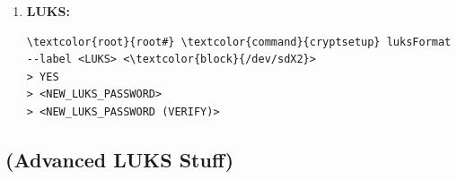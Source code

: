 \documentclass[10pt, a4paper, onecolumn, oneside, titlepage, openany]{book}
\begin{document}
\begin{enumerate}
\begin{enumerate}
\begin{Verbatim}[commandchars=\\\{\}]
\textcolor{root}{root#} \textcolor{command}{mkfs.fat} -F 32 <\textcolor{block}{/dev/sdX1}>
\textcolor{root}{root#} \textcolor{command}{fatlabel} <\textcolor{block}{/dev/sdX1}> <ESP>
\end{Verbatim}
        \item \textbf{LUKS:}
\begin{Verbatim}[commandchars=\\\{\}]
\textcolor{root}{root#} \textcolor{command}{cryptsetup} luksFormat --label <LUKS> <\textcolor{block}{/dev/sdX2}>
> YES
> <NEW_LUKS_PASSWORD>
> <NEW_LUKS_PASSWORD (VERIFY)>
\end{Verbatim}
    \end{enumerate}
\end{enumerate}
    \subsection{(Advanced LUKS Stuff)}
\end{document}
